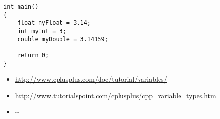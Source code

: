 
\begin{lstlisting}
int main()
{
	float myFloat = 3.14;
	int myInt = 3;
	double myDouble = 3.14159;

	return 0;
}
\end{lstlisting}



\begin{itemize}
\item \url{http://www.cplusplus.com/doc/tutorial/variables/}
\item \url{http://www.tutorialspoint.com/cplusplus/cpp_variable_types.htm}
\item \url{~}
\end{itemize}	